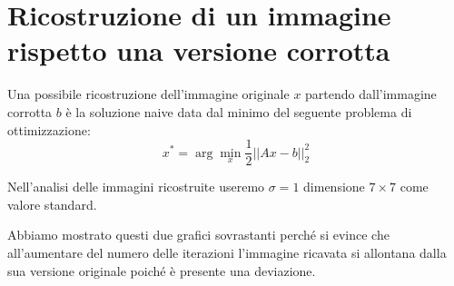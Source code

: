 \section{Ricostruzione di un immagine rispetto una versione corrotta}
Una possibile ricostruzione dell'immagine originale $x$ partendo dall'immagine corrotta $b$ è la soluzione naive data dal minimo del seguente problema di ottimizzazione:
\[x^* = \arg\min_x \frac{1}{2} ||Ax - b||_2^2\]

Nell'analisi delle immagini ricostruite useremo $\sigma=1$ dimensione $7\times 7$ come valore standard.

Abbiamo mostrato questi due grafici sovrastanti perché si evince che all'aumentare del numero delle 
iterazioni l'immagine ricavata si allontana dalla sua versione originale poiché è presente una deviazione. 

